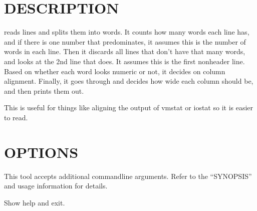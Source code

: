 \documentclass[letterpaper,10pt,english]{sphinxmanual}
\begin{document}
\section{DESCRIPTION}
\label{\detokenize{mariadb-align-output:description}}
\sphinxAtStartPar
{} reads lines and splits them into words.  It counts how many
words each line has, and if there is one number that predominates, it assumes
this is the number of words in each line.  Then it discards all lines that
don’t have that many words, and looks at the 2nd line that does.  It assumes
this is the first non\sphinxhyphen{}header line.  Based on whether each word looks numeric
or not, it decides on column alignment.  Finally, it goes through and decides
how wide each column should be, and then prints them out.

\sphinxAtStartPar
This is useful for things like aligning the output of vmstat or iostat so it
is easier to read.


\section{OPTIONS}
\label{\detokenize{mariadb-align-output:options}}
\sphinxAtStartPar
This tool accepts additional command\sphinxhyphen{}line arguments.  Refer to the
“SYNOPSIS” and usage information for details.

\begin{fulllineitems}
\label{\detokenize{mariadb-align-output:cmdoption-mariadb-align-output-help}}
\sphinxAtStartPar
Show help and exit.

\end{fulllineitems}

\end{document}
